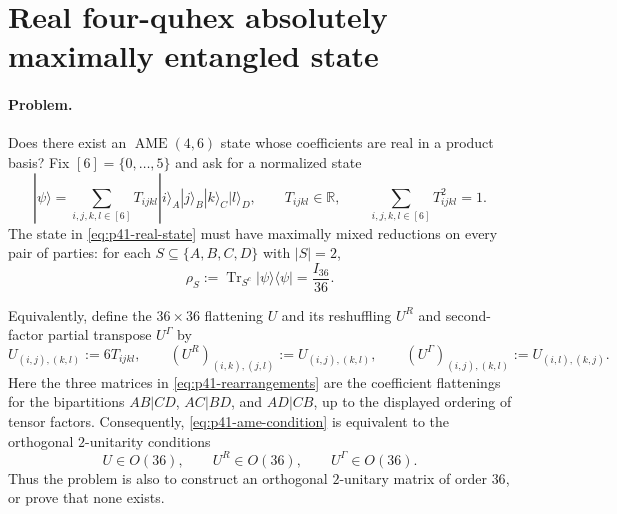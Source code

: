 \section{Real four-quhex absolutely maximally entangled state}
\label{sec:op_f60b9a99d7945e3b}

\paragraph{Problem.}
Does there exist an $\operatorname{AME}(4,6)$ state whose coefficients are
real in a product basis?  Fix $[6]=\{0,\ldots,5\}$ and ask for a normalized
state
\begin{equation}
  |\psi\rangle
  =\sum_{i,j,k,l\in[6]}T_{ijkl}|i\rangle_A|j\rangle_B
    |k\rangle_C|l\rangle_D,
  \qquad
  T_{ijkl}\in\mathbb{R},
  \qquad
  \sum_{i,j,k,l\in[6]}T_{ijkl}^{2}=1 .
  \label{eq:p41-real-state}
\end{equation}
The state in \eqref{eq:p41-real-state} must have maximally mixed reductions
on every pair of parties: for each $S\subseteq\{A,B,C,D\}$ with $|S|=2$,
\begin{equation}
  \rho_S:=\operatorname{Tr}_{S^{c}}|\psi\rangle\!\langle\psi|
  =\frac{I_{36}}{36} .
  \label{eq:p41-ame-condition}
\end{equation}

Equivalently, define the $36\times36$ flattening $U$ and its reshuffling
$U^R$ and second-factor partial transpose $U^\Gamma$ by
\begin{equation}
  U_{(i,j),(k,l)}:=6T_{ijkl},
  \qquad
  (U^R)_{(i,k),(j,l)}:=U_{(i,j),(k,l)},
  \qquad
  (U^\Gamma)_{(i,j),(k,l)}:=U_{(i,l),(k,j)} .
  \label{eq:p41-rearrangements}
\end{equation}
Here the three matrices in \eqref{eq:p41-rearrangements} are the coefficient
flattenings for the bipartitions $AB|CD$, $AC|BD$, and $AD|CB$, up to the
displayed ordering of tensor factors.  Consequently,
\eqref{eq:p41-ame-condition} is equivalent to the orthogonal
$2$-unitarity conditions
\begin{equation}
  U\in O(36),
  \qquad
  U^R\in O(36),
  \qquad
  U^\Gamma\in O(36) .
  \label{eq:p41-orthogonal-two-unitarity}
\end{equation}
Thus the problem is also to construct an orthogonal $2$-unitary matrix of
order $36$, or prove that none exists.

